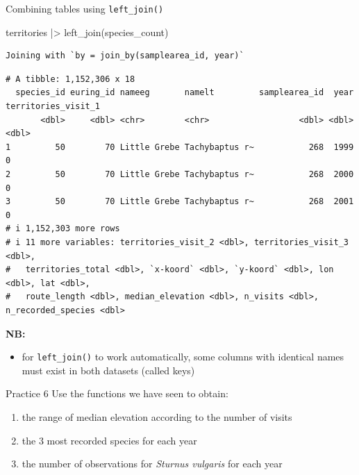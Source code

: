 \documentclass[
  ignorenonframetext,
  aspectratio=169,
]{beamer}
\newenvironment{Shaded}{\begin{snugshade}}{\end{snugshade}}
\newcommand{\FunctionTok}[1]{\textcolor[rgb]{0.28,0.35,0.67}{#1}}
\newcommand{\NormalTok}[1]{\textcolor[rgb]{0.00,0.23,0.31}{#1}}
\newcommand{\SpecialCharTok}[1]{\textcolor[rgb]{0.37,0.37,0.37}{#1}}
\providecommand{\tightlist}{%
  \setlength{\itemsep}{0pt}\setlength{\parskip}{0pt}}
\let\oldtexttt\texttt
\renewcommand{\texttt}[1]{\colorbox{gray!20}{\oldtexttt{#1}}}
\begin{document}
\begin{frame}[fragile]{Combining tables using \texttt{left\_join()}}
\protect{}\label{combining-tables-using-left_join}
\footnotesize

\begin{Shaded}
\begin{Highlighting}[]
\NormalTok{territories }\SpecialCharTok{|\textgreater{}} \FunctionTok{left\_join}\NormalTok{(species\_count)}
\end{Highlighting}
\end{Shaded}

\begin{verbatim}
Joining with `by = join_by(samplearea_id, year)`
\end{verbatim}

\begin{verbatim}
# A tibble: 1,152,306 x 18
  species_id euring_id nameeg       namelt         samplearea_id  year territories_visit_1
       <dbl>     <dbl> <chr>        <chr>                  <dbl> <dbl>               <dbl>
1         50        70 Little Grebe Tachybaptus r~           268  1999                   0
2         50        70 Little Grebe Tachybaptus r~           268  2000                   0
3         50        70 Little Grebe Tachybaptus r~           268  2001                   0
# i 1,152,303 more rows
# i 11 more variables: territories_visit_2 <dbl>, territories_visit_3 <dbl>,
#   territories_total <dbl>, `x-koord` <dbl>, `y-koord` <dbl>, lon <dbl>, lat <dbl>,
#   route_length <dbl>, median_elevation <dbl>, n_visits <dbl>, n_recorded_species <dbl>
\end{verbatim}

\normalsize

\pause

\textbf{NB:}

\begin{itemize}
\tightlist
\item
  for \texttt{left\_join()} to work automatically, some columns with
  identical names must exist in both datasets (called keys)
\end{itemize}
\end{frame}

\begin{frame}{Practice 6}
\protect{}\label{practice-6}
Use the functions we have seen to obtain:

\begin{enumerate}
\tightlist
\item
  the range of median elevation according to the number of visits
\item
  the 3 most recorded species for each year
\item
  the number of observations for \emph{Sturnus vulgaris} for each year
\end{enumerate}
\end{frame}
\end{document}
